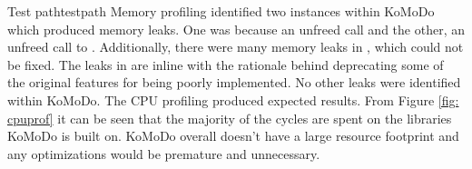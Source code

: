 {
		}{Test path}{testpath}
%
Memory profiling identified two instances within KoMoDo which produced memory leaks. One was because an unfreed call  and the other, an unfreed call to . Additionally, there were many memory leaks in , which could not be fixed. The leaks in  are inline with the rationale behind deprecating some of the original features for being poorly implemented.
%
No other leaks were identified within KoMoDo.
%
The CPU profiling produced expected results. From Figure \ref{fig: cpuprof} it can be seen that the majority of the cycles are spent on the libraries KoMoDo is built on. KoMoDo overall doesn't have a large resource footprint and any optimizations would be premature and unnecessary.

